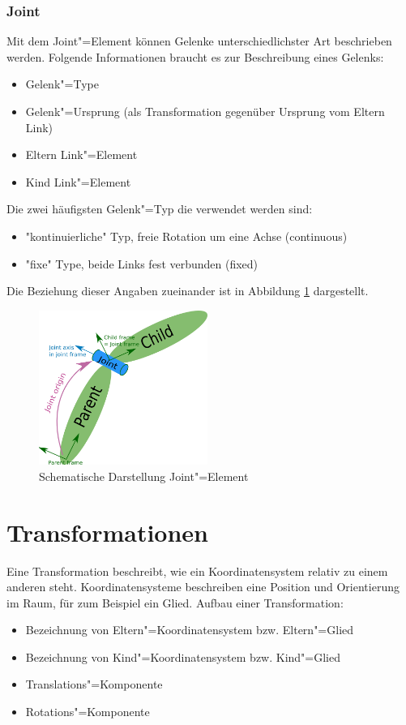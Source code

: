 \subsubsection{Joint}
\label{chap:joint}
Mit dem Joint"=Element können Gelenke unterschiedlichster Art beschrieben werden.
Folgende Informationen braucht es zur Beschreibung eines Gelenks:
\begin{itemize}
\item Gelenk"=Type
\item Gelenk"=Ursprung (als Transformation gegenüber Ursprung vom Eltern Link)
\item Eltern Link"=Element
\item Kind Link"=Element
\end{itemize}
Die zwei häufigsten Gelenk"=Typ die verwendet werden sind:
\begin{itemize}
\item \textsc{"}kontinuierliche\textsc{"} Typ, freie Rotation um eine Achse (continuous)
\item \textsc{"}fixe\textsc{"} Type, beide Links fest verbunden (fixed)
\end{itemize} 
Die Beziehung dieser Angaben  zueinander ist in Abbildung \ref{Ab:aufbaut-joint} dargestellt.
\begin{figure}[ht!]
	\centering
	\includegraphics[width=5.5cm]{images/urdf_joint.png}
	\caption{Schematische Darstellung Joint"=Element \cite{ros}}
	\label{Ab:aufbaut-joint}
\end{figure}




\section{Transformationen} %
\label{chap:transformationen}
Eine Transformation beschreibt, wie ein Koordinatensystem relativ zu einem anderen steht.
Koordinatensysteme beschreiben eine Position und Orientierung im Raum, für zum Beispiel ein Glied.
Aufbau einer Transformation:
\begin{itemize}
\item Bezeichnung von Eltern"=Koordinatensystem bzw. Eltern"=Glied
\item Bezeichnung von Kind"=Koordinatensystem bzw. Kind"=Glied
\item Translations"=Komponente
\item Rotations"=Komponente
\end{itemize}

